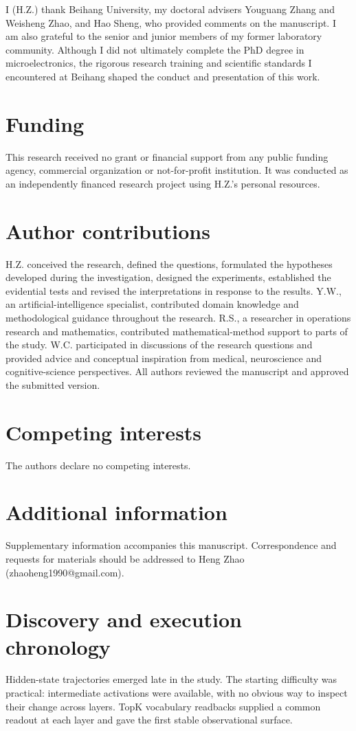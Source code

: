 \documentclass[11pt]{article}
\begin{document}
{I (H.Z.) thank Beihang University, my doctoral advisers Youguang Zhang and Weisheng Zhao, and Hao Sheng, who provided comments on the manuscript. I am also grateful to the senior and junior members of my former laboratory community. Although I did not ultimately complete the PhD degree in microelectronics, the rigorous research training and scientific standards I encountered at Beihang shaped the conduct and presentation of this work.

\section{Funding}
This research received no grant or financial support from any public funding agency, commercial organization or not-for-profit institution. It was conducted as an independently financed research project using H.Z.'s personal resources.

\section{Author contributions}
H.Z. conceived the research, defined the questions, formulated the hypotheses developed during the investigation, designed the experiments, established the evidential tests and revised the interpretations in response to the results. Y.W., an artificial-intelligence specialist, contributed domain knowledge and methodological guidance throughout the research. R.S., a researcher in operations research and mathematics, contributed mathematical-method support to parts of the study. W.C. participated in discussions of the research questions and provided advice and conceptual inspiration from medical, neuroscience and cognitive-science perspectives. All authors reviewed the manuscript and approved the submitted version.

\section{Competing interests}
The authors declare no competing interests.

\section{Additional information}
Supplementary information accompanies this manuscript. Correspondence and requests for materials should be addressed to Heng Zhao (zhaoheng1990@gmail.com).

}
\clearpage
\appendix
\section{Discovery and execution chronology}
Hidden-state trajectories emerged late in the study. The starting difficulty was practical: intermediate activations were available, with no obvious way to inspect their change across layers. TopK vocabulary readbacks supplied a common readout at each layer and gave the first stable observational surface.
\end{document}
